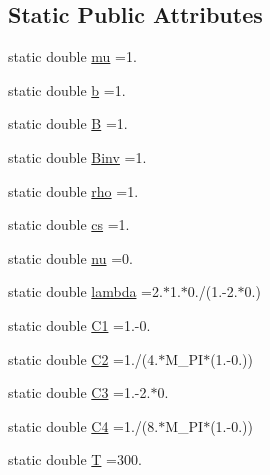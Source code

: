 \subsection*{Static Public Attributes}
\begin{DoxyCompactItemize}
\item 
static double \hyperlink{classmodel_1_1_material_3_01_isotropic_01_4_a299c77803eceaa3ce1d6c7f931028da3}{mu} =1.
\item 
static double \hyperlink{classmodel_1_1_material_3_01_isotropic_01_4_a8d27809d336e9e463000877b5af8cba2}{b} =1.
\item 
static double \hyperlink{classmodel_1_1_material_3_01_isotropic_01_4_abff932e0b33c9e4b8d58f7bb9b1c5672}{B} =1.
\item 
static double \hyperlink{classmodel_1_1_material_3_01_isotropic_01_4_a8cafb424a37398ed2466c9231e6dfe3d}{Binv} =1.
\item 
static double \hyperlink{classmodel_1_1_material_3_01_isotropic_01_4_ae892574680a428d133451e44a23aad41}{rho} =1.
\item 
static double \hyperlink{classmodel_1_1_material_3_01_isotropic_01_4_a5042b3bcd496c68eab5430543476d70e}{cs} =1.
\item 
static double \hyperlink{classmodel_1_1_material_3_01_isotropic_01_4_af4ba0bae69cdb10d6a198e51c0dd5ee2}{nu} =0.
\item 
static double \hyperlink{classmodel_1_1_material_3_01_isotropic_01_4_adb6540f3999b1001c5525f395cabd635}{lambda} =2.$\ast$1.$\ast$0./(1.-\/2.$\ast$0.)
\item 
static double \hyperlink{classmodel_1_1_material_3_01_isotropic_01_4_a058681aa4f39d02334efb83c1eab8652}{C1} =1.-\/0.
\item 
static double \hyperlink{classmodel_1_1_material_3_01_isotropic_01_4_afbbc126d8ae1ba39a918cd2e1d5dd507}{C2} =1./(4.$\ast$M\+\_\+\+P\+I$\ast$(1.-\/0.))
\item 
static double \hyperlink{classmodel_1_1_material_3_01_isotropic_01_4_a43f9ad024d3b9b4a03b52e2ffe02566c}{C3} =1.-\/2.$\ast$0.
\item 
static double \hyperlink{classmodel_1_1_material_3_01_isotropic_01_4_a6a8832be4971bb5d8c099ace3b96b7e7}{C4} =1./(8.$\ast$M\+\_\+\+P\+I$\ast$(1.-\/0.))
\item 
static double \hyperlink{classmodel_1_1_material_3_01_isotropic_01_4_ac8253463339421c8137b2aa195488a8c}{T} =300.
\item 

\end{DoxyCompactItemize}
